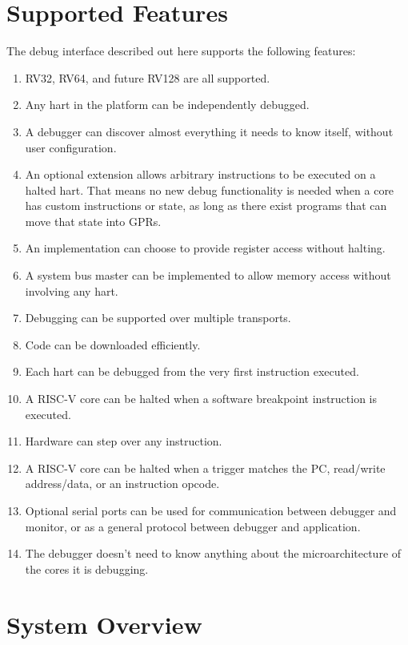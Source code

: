 \documentclass{article}
\begin{document}
\section{Supported Features}
The debug interface described out here supports the following features:
\begin{enumerate}
   \item RV32, RV64, and future RV128 are all supported.
   \item Any hart in the platform can be independently debugged.
   \item A debugger can discover almost everything it needs to know itself,
       without user configuration.
   \item An optional extension allows arbitrary instructions to be executed on
       a halted hart. That means no new debug functionality is needed when a
       core has custom instructions or state, as long as there exist programs
       that can move that state into GPRs.
   \item An implementation can choose to provide register access without
       halting.
   \item A system bus master can be implemented to allow memory access without
       involving any hart.
   \item Debugging can be supported over multiple transports.
   \item Code can be downloaded efficiently.
   \item Each hart can be debugged from the very first instruction executed.
   \item A RISC-V core can be halted when a software breakpoint instruction is
       executed.
   \item Hardware can step over any instruction.
   \item A RISC-V core can be halted when a trigger matches the PC, read/write
       address/data, or an instruction opcode.
   \item Optional serial ports can be used for communication between debugger
       and monitor, or as a general protocol between debugger and application.
   \item The debugger doesn't need to know anything about the microarchitecture
       of the cores it is debugging.
\end{enumerate}

\section{System Overview}
\end{document}
